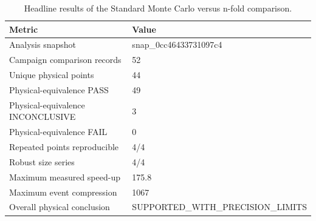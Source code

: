 \begin{table}
\caption{Headline results of the Standard Monte Carlo versus n-fold comparison.}
\label{tab:headline_summary}
\begin{tabular}{ll}
\toprule
Metric & Value \\
\midrule
Analysis snapshot & snap\_0cc46433731097c4 \\
Campaign comparison records & 52 \\
Unique physical points & 44 \\
Physical-equivalence PASS & 49 \\
Physical-equivalence INCONCLUSIVE & 3 \\
Physical-equivalence FAIL & 0 \\
Repeated points reproducible & 4/4 \\
Robust size series & 4/4 \\
Maximum measured speed-up & 175.8 \\
Maximum event compression & 1067 \\
Overall physical conclusion & SUPPORTED\_WITH\_PRECISION\_LIMITS \\
\bottomrule
\end{tabular}
\end{table}
